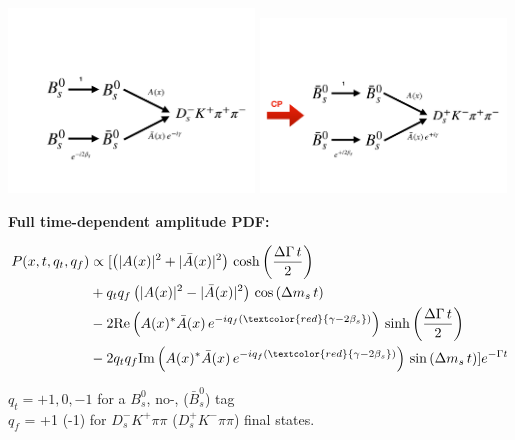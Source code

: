 \documentclass[]{beamer}
\begin{document}
\begin{frame}[plain]

	\centering
	\vspace{-1cm}
		\includegraphics[width=0.49\textwidth, height = !]{plots/Bs_gamma.pdf} 	
		\includegraphics[width=0.49\textwidth, height = !]{plots/Bs_gamma_CP.pdf} 	
		
		
	\small
		\textbf{Full time-dependent amplitude PDF:}
		\scriptsize
	\begin{block}{}
\begin{align*}
	P(x,t,q_t,q_f) &\propto  [
	 \left( \vert A(x) \vert^2 + \vert \bar A(x) \vert^2 \right) \, \text{cosh} \left( \frac{\Delta \Gamma \, t}{2}\right) \\
	 & + q_t q_f \left( \vert A(x) \vert^2 - \vert \bar A(x) \vert^2 \right) \, \text{cos} \left( \Delta m_s \, t \right)  \\
	 & -2 \text{Re}\left( A(x)^{*}  \bar A(x) \, e^{-i q_f (\textcolor{red}{\gamma - 2\beta_s})}  \right) \, \text{sinh} \left( \frac{\Delta \Gamma \, t}{2}\right)  \\
	 & -2 q_t q_f \text{Im}\left( A(x)^{*}  \bar A(x) \, e^{-i q_f (\textcolor{red}{\gamma - 2\beta_s})}  \right)\, \text{sin} \left( \Delta  m_s \, t \right)  ]  e^{- \Gamma t}
\end{align*}
	\end{block}

$q_t = +1,0,-1$ for a $B_s^{0}$, no-,  ($\bar B_s^{0}$) tag  \\ 
$q_f$ = +1 $ $(-1) for $D_s^{-} K^{+} \pi\pi$ ($D_s^{+} K^{-} \pi\pi$) final states. 
				
\end{frame}
\end{document}
